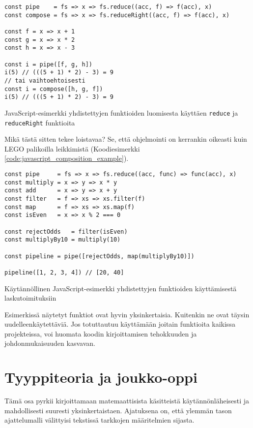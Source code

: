 \begin{code}
    \begin{verbatim}
const pipe    = fs => x => fs.reduce((acc, f) => f(acc), x)
const compose = fs => x => fs.reduceRight((acc, f) => f(acc), x)

const f = x => x + 1
const g = x => x * 2
const h = x => x - 3

const i = pipe([f, g, h])
i(5) // (((5 + 1) * 2) - 3) = 9
// tai vaihtoehtoisesti 
const i = compose([h, g, f])
i(5) // (((5 + 1) * 2) - 3) = 9
\end{verbatim}
    \caption{JavaScript-esimerkki yhdistettyjen funktioiden luomisesta käyttäen \texttt{reduce} ja \texttt{reduceRight} funktioita}
    \label{code:javascript_better_pipe}
\end{code}

Mikä tästä sitten tekee loistavaa? Se, että ohjelmointi on kerrankin oikeasti kuin LEGO palikoilla leikkimistä (Koodiesimerkki \ref{code:javascript_composition_example}).

\begin{code}
    \begin{verbatim}
const pipe     = fs => x => fs.reduce((acc, func) => func(acc), x)
const multiply = x => y => x * y
const add      = x => y => x + y
const filter   = f => xs => xs.filter(f)
const map      = f => xs => xs.map(f)
const isEven   = x => x % 2 === 0

const rejectOdds   = filter(isEven)
const multiplyBy10 = multiply(10)

const pipeline = pipe([rejectOdds, map(multiplyBy10)])

pipeline([1, 2, 3, 4]) // [20, 40]
\end{verbatim}
    \caption{Käytännöllinen JavaScript-esimerkki yhdistettyjen funktioiden käyttämisestä laskutoimituksiin}
    \label{code:javascript_composition_example}
\end{code}

Esimerkissä näytetyt funktiot ovat hyvin yksinkertaisia. Kuitenkin ne ovat täysin uudelleenkäytettäviä. Jos totuttautuu käyttämään joitain funktioita kaikissa projekteissa, voi huomata koodin kirjoittamisen tehokkuuden ja johdonmukaisuuden kasvavan.

\section{Tyyppiteoria ja joukko-oppi}
Tämä osa pyrkii kirjoittamaan matemaattisista käsitteistä käytännönläheisesti ja mahdollisesti suuresti yksinkertaistaen. Ajatuksena on, että ylemmän tason ajattelumalli välittyisi tekstissä tarkkojen määritelmien sijasta.

